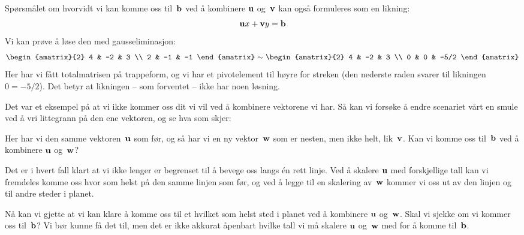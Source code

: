 Spørsmålet om hvorvidt vi kan komme oss til~$\mathbf{b}$ ved å kombinere $\mathbf{u}$
og~$\mathbf{v}$ kan også formuleres som en likning:
\[
\mathbf{u} x + \mathbf{v} y = \mathbf{b}
\]
Vi kan prøve å løse den med gausseliminasjon:
\[
\begin{amatrix}{2}
4 & -2 & 3 \\
2 & -1 & -1
\end{amatrix}
\roweq
\begin{amatrix}{2}
4 & -2 & 3 \\
0 & 0 & -5/2
\end{amatrix}
\]
Her har vi fått totalmatrisen på trappeform, og vi har et pivotelement
til høyre for streken (den nederste raden svarer til likningen
$0 = -5/2$).  Det betyr at likningen -- som forventet -- ikke har noen
løsning.

\smallskip%
Det var et eksempel på at vi ikke kommer oss dit vi vil ved å
kombinere vektorene vi har.  Så kan vi forsøke å endre scenariet vårt
en smule ved å vri littegrann på den ene vektoren, og se hva som skjer:
\begin{center}
\end{center}
Her har vi den samme vektoren~$\mathbf{u}$ som før, og så har vi en ny
vektor~$\mathbf{w}$ som er nesten, men ikke helt, lik~$\mathbf{v}$.  Kan vi komme
oss til~$\mathbf{b}$ ved å kombinere $\mathbf{u}$ og~$\mathbf{w}$?

Det er i hvert fall klart at vi ikke lenger er begrenset til å bevege
oss langs én rett linje.  Ved å skalere $\mathbf{u}$ med forskjellige tall kan
vi fremdeles komme oss hvor som helst på den samme linjen som før, og
ved å legge til en skalering av~$\mathbf{w}$ kommer vi oss ut av den linjen og
til andre steder i planet.

Nå kan vi gjette at vi kan klare å komme oss til et hvilket som helst
sted i planet ved å kombinere $\mathbf{u}$ og~$\mathbf{w}$.  Skal vi sjekke om vi
kommer oss til~$\mathbf{b}$?  Vi bør kunne få det til, men det er ikke akkurat
åpenbart hvilke tall vi må skalere $\mathbf{u}$ og~$\mathbf{w}$ med for å komme
til~$\mathbf{b}$.

